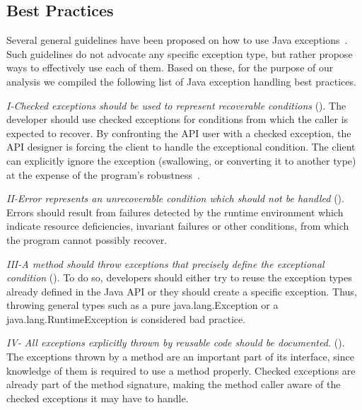 \documentclass[conference]{IEEEtran}
\begin{document}
\subsection{Best Practices}
\label{sec:best}

Several general guidelines have been proposed on how to use Java
exceptions~\cite{mandrioli1992advances,gosling2000java,wirfs2006toward,
bloch2008effective}. Such guidelines do not
advocate any specific exception type, but rather propose ways to effectively use each of them.
Based on these, for the purpose of our analysis we compiled the following list of Java exception handling best practices.


\emph{I-Checked exceptions should be used to represent recoverable
conditions} (\cite{mandrioli1992advances,gosling2000java,wirfs2006toward,bloch2008effective}).
The developer should use checked exceptions for conditions from which the caller
is expected to recover. By confronting the API user with a checked exception,
the API designer is forcing the client to handle the exceptional condition. The
client can explicitly ignore the exception (swallowing, or converting it to
another type) at the expense of the program's robustness~\cite{gosling2000java}.

\emph{II-Error represents an unrecoverable condition which should not be handled} 
(\cite{gosling2000java}).  Errors should result from failures detected
by the runtime environment which indicate resource deficiencies, invariant
failures or other conditions, from which the program cannot possibly recover.


\emph{III-A method should throw exceptions that precisely define the
exceptional condition} (\cite{gosling2000java,bloch2008effective}). To do so,
developers should either try to reuse the exception types already defined in the
Java API or they should create a specific exception. Thus, throwing general types such as a
pure java.lang.Exception or a java.lang.RuntimeException is considered bad practice.


\emph{IV- All exceptions explicitly thrown by reusable code should be documented.}
(\cite{mandrioli1992advances,gosling2000java,wirfs2006toward,bloch2008effective}).
The exceptions thrown by a method are an important part of its interface,
since knowledge of them is required to use a method properly. 
Checked exceptions are already
part of the  method signature, making the method caller aware of the checked
exceptions it may have to handle. 
\end{document}
